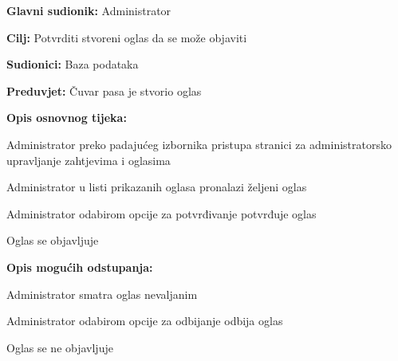 					\noindent {}
					\begin{packed_item}
						
						\item \textbf{Glavni sudionik: } Administrator
						\item  \textbf{Cilj:} Potvrditi stvoreni oglas da se može objaviti
						\item  \textbf{Sudionici:} Baza podataka
						\item  \textbf{Preduvjet:} Čuvar pasa je stvorio oglas
						\item  \textbf{Opis osnovnog tijeka:}
						
						\item[] \begin{packed_enum}
							
							\item Administrator preko padajućeg izbornika pristupa stranici za administratorsko upravljanje zahtjevima i oglasima
							\item Administrator u listi prikazanih oglasa pronalazi željeni oglas
							\item Administrator odabirom opcije za potvrđivanje potvrđuje oglas
							\item Oglas se objavljuje
							
						\end{packed_enum}
						\item  \textbf{Opis mogućih odstupanja:}
						
						\item[] \begin{packed_item}
							
							\item[3.a] Administrator smatra oglas nevaljanim
							\item[] \begin{packed_enum}
								
								\item Administrator odabirom opcije za odbijanje odbija oglas
								\item Oglas se ne objavljuje
								
							\end{packed_enum}
							
						\end{packed_item}
					\end{packed_item}
					
